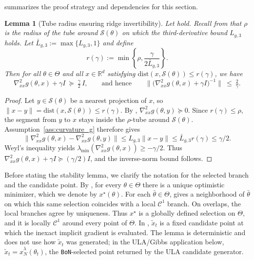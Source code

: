 \documentclass{article}
\theoremstyle{normaltheorem}
\newtheorem{lemma}[lemma]{Lemma}
\newcommand{\R}{\mathbb{R}}
\newcommand{\calS}{\mathcal{S}}
\newcommand{\BoN}{\texttt{BoN}\xspace}
\begin{document}
 summarizes the proof strategy and dependencies for this section.

\begin{lemma}[Tube radius ensuring ridge invertibility]\label{lem:tube-invertibility}
Let  hold.
Recall from  that \(\rho\) is the radius of the tube around \(\calS(\theta)\) on which the
third-derivative bound \(L_{g,3}\) holds. Let \(\bar L_{g,3}:=\max\{L_{g,3},1\}\) and define
\[
r(\gamma):=\min\left\{\rho,\frac{\gamma}{2\bar L_{g,3}}\right\}.
\]
Then for all $\theta\in\Theta$ and all
$x\in\R^d$ satisfying $\mathrm{dist}(x,\calS(\theta))\le r(\gamma)$, we have
\[
\nabla^2_{xx}g(\theta,x)+\gamma I \ \succeq\ \tfrac{\gamma}{2}\,I,
\qquad\text{and hence}\qquad
\big\|\big(\nabla^2_{xx}g(\theta,x)+\gamma I\big)^{-1}\big\|\ \le\ \tfrac{2}{\gamma}.
\]
\end{lemma}
\begin{proof}
Let \(y\in\calS(\theta)\) be a nearest projection of \(x\), so \(\|x-y\|=\mathrm{dist}(x,\calS(\theta))\le r(\gamma)\).
By , \(\nabla^2_{xx}g(\theta,y)\succeq 0\).
Since \(r(\gamma)\le\rho\), the segment from \(y\) to \(x\) stays inside the \(\rho\)-tube around \(\calS(\theta)\).
Assumption~\ref{ass:curvature_g} therefore gives
\[
\|\nabla^2_{xx}g(\theta,x)-\nabla^2_{xx}g(\theta,y)\|
\le L_{g,3}\|x-y\|
\le \bar L_{g,3}r(\gamma)
\le \gamma/2.
\]
Weyl's inequality yields \(\lambda_{\min}(\nabla^2_{xx}g(\theta,x))\ge-\gamma/2\).
Thus \(\nabla^2_{xx}g(\theta,x)+\gamma I\succeq(\gamma/2)I\), and the inverse-norm bound follows.
\end{proof}

Before stating the stability lemma, we clarify the notation for the selected branch and the candidate point. By , for every
\(\theta\in\Theta\) there is a unique optimistic minimizer, which we denote by \(x^\star(\theta)\). For each
\(\bar\theta\in\Theta\),  gives a neighborhood of \(\bar\theta\) on which this same selection
coincides with a local \(\mathcal{C}^{1}\) branch. On overlaps, the local branches agree by uniqueness. Thus \(x^\star\) is a
globally defined selection on \(\Theta\), and it is locally \(\mathcal{C}^{1}\) around every point of \(\Theta\).
In , \(\tilde x_t\) is a fixed candidate point at which the inexact implicit gradient is evaluated.
The lemma is deterministic and does not use how \(\tilde x_t\) was generated; in the ULA/Gibbs application below,
\(\tilde x_t=\hat x_N^\lambda(\theta_t)\), the \BoN-selected point returned by the ULA candidate generator.
\end{document}
